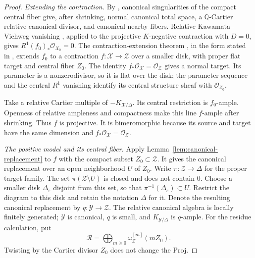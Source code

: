 \documentclass[11pt,a4paper]{article}
\numberwithin{equation}{section}
\theoremstyle{definition}
\theoremstyle{remark}
\newcommand{\Q}{\mathbb Q}\newcommand{\R}{\mathbb R}
\newcommand{\OO}{\mathcal O}\newcommand{\cX}{\mathcal X}
\begin{document}
\begin{proof}
\emph{Extending the contraction.}
By \cite[Lemma~10 and Remark~10.3]{Kollar2021}, canonical
singularities of the compact central fiber give, after shrinking,
normal canonical total space, a $\Q$-Cartier relative canonical
divisor, and canonical nearby fibers. Relative Kawamata--Viehweg
vanishing \cite[Theorem~5.2]{Fujino2022}, applied to the
projective $K$-negative contraction with $D=0$, gives
$R^1(f_0)_*\OO_{X_0}=0$. The contraction-extension theorem
\cite[Proposition~11.4]{KM1992}, in the form stated in
\cite[Theorem~4.7]{HLR2026}, extends $f_0$ to a contraction
$f:\mathcal X\to\mathcal Z$ over a smaller disk, with proper
flat target and central fiber $Z_0$.
The identity $f_*\OO_{\mathcal X}=\OO_{\mathcal Z}$ gives a normal
target. Its parameter is a nonzerodivisor, so it is flat over the
disk; the parameter sequence and the central $R^1$ vanishing
identify its central structure sheaf with $\OO_{Z_0}$.

Take a relative Cartier multiple of $-K_{\mathcal X/\Delta}$.
Its central restriction is $f_0$-ample. Openness of relative
ampleness \cite[Proposition~3.5]{HLR2026} and compactness make
this line $f$-ample after shrinking. Thus $f$ is projective. It is bimeromorphic because its source
and target have the same dimension and
$f_*\OO_{\mathcal X}=\OO_{\mathcal Z}$.

\smallskip\noindent\emph{The positive model and its central fiber.}
Apply Lemma~\ref{lem:canonical-replacement} to $f$ with the compact
subset $Z_0\subset\mathcal Z$. It gives the canonical replacement over
an open neighborhood $U$ of $Z_0$. Write $\pi:\mathcal Z\to\Delta$
for the proper target family. The set $\pi(\mathcal Z\setminus U)$ is
closed and does not contain $0$. Choose a smaller disk
$\Delta_\varepsilon$ disjoint from this set, so that
$\pi^{-1}(\Delta_\varepsilon)\subset U$. Restrict the diagram to
this disk and retain the notation $\Delta$ for it. Denote the resulting
canonical replacement by $q:\mathcal Y\to\mathcal Z$.
The relative canonical algebra is locally finitely generated;
$\mathcal Y$ is canonical, $q$ is small, and
$K_{\mathcal Y/\Delta}$ is $q$-ample.
For the residue calculation, put
\begin{equation}\label{eq:family-canonical-algebra}
 \mathscr R=\bigoplus_{m\ge0}
 \omega_{\mathcal Z}^{[m]}(mZ_0).
\end{equation}
Twisting by the Cartier divisor $Z_0$ does not change the Proj.


\end{proof}
\end{document}
